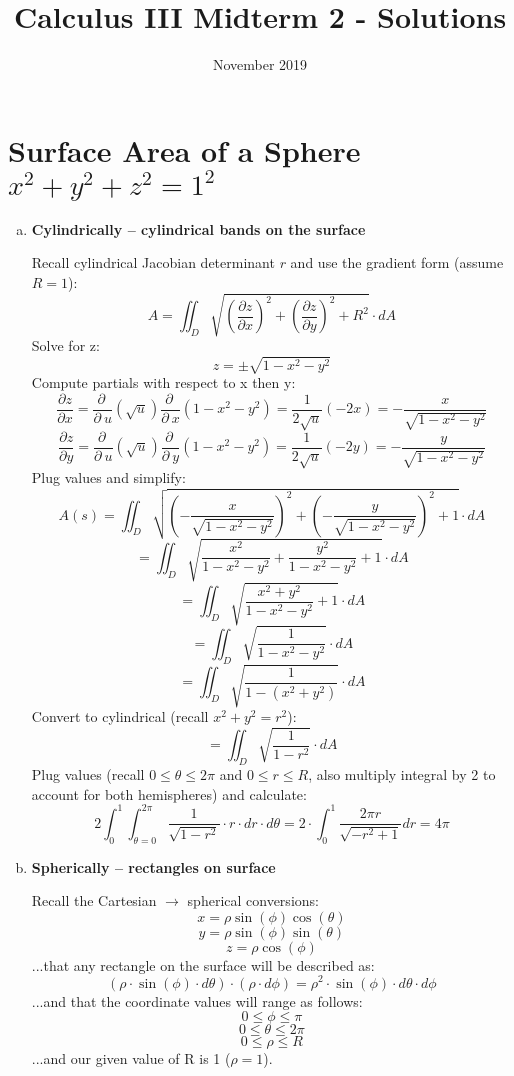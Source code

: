 \documentclass{article}
\title{Calculus III Midterm 2 - Solutions}
\date{November 2019}
\begin{document}
\maketitle

\section{Surface Area of a Sphere $x^2 + y^2 + z^2 = 1^2$ }
\begin{enumerate}[a.]
	\item \textbf{Cylindrically -- cylindrical bands on the surface }

            Recall cylindrical Jacobian determinant $ r $ and use the gradient form (assume $R = 1$):
            \[ A = \iint_{D}\sqrt{ (\frac{\partial z}{\partial x})^2 + (\frac{\partial z}{\partial y})^2 + R^2 } \cdot dA \]
            Solve for z:
            \[ z = \pm\sqrt{1-x^{2}-y^{2}} \]
            Compute partials with respect to x then y:
            \[ \frac{\partial z}{\partial x} = \frac{\partial \:}{\partial \:u}\left(\sqrt{u}\right)\frac{\partial \:}{\partial \:x}\left(1-x^2-y^2\right) = \frac{1}{2\sqrt{u}}\left(-2x\right) = -\frac{x}{\sqrt{1-x^2-y^2}} \]
            \[ \frac{\partial z}{\partial y} = \frac{\partial \:}{\partial \:u}\left(\sqrt{u}\right)\frac{\partial \:}{\partial \:y}\left(1-x^2-y^2\right) = \frac{1}{2\sqrt{u}}\left(-2y\right) = -\frac{y}{\sqrt{1-x^2-y^2}} \]
            Plug values and simplify:
            \[ A(s) = \iint_{D}\sqrt{\left(-\frac{x}{\sqrt{1-x^2-y^2}}\right)^2+\left(-\frac{y}{\sqrt{1-x^2-y^2}}\right)^2+1}  \cdot dA \]
            \[ = \iint_{D}\sqrt{\frac{x^2}{1-x^2-y^2}+\frac{y^2}{1-x^2-y^2}+1}  \cdot dA \]
            \[ = \iint_{D}\sqrt{\frac{x^2+y^2}{1-x^2-y^2}+1}  \cdot dA \]
            \[ = \iint_{D}\sqrt{\frac{1}{1-x^2-y^2}}  \cdot dA \]
            \[ = \iint_{D}\sqrt{\frac{1}{1-(x^2+y^2)}}  \cdot dA \]
            Convert to cylindrical (recall $x^2 + y^2 = r^2$):
            \[ = \iint_{D}\sqrt{\frac{1}{1-r^2}}  \cdot dA \]
            Plug values (recall $0 \leq \theta \leq 2\pi $ and $0 \leq r \leq R $, also multiply integral by 2 to account for both hemispheres) and calculate:
            \[ 2\int_{0}^{1}\int_{\theta=0}^{2\pi} \frac{1}{\sqrt{1-r^2}}\cdot r \cdot dr \cdot d\theta = 2\cdot \int _0^1\frac{2\pi r}{\sqrt{-r^2+1}}dr = 4\pi \]

	\item \textbf{Spherically -- rectangles on surface}

            Recall the Cartesian $\rightarrow$ spherical conversions:
            \[ x = \rho\sin(\phi)\cos(\theta)   \]
            \[ y = \rho\sin(\phi)\sin(\theta)  \]
            \[ z = \rho\cos(\phi)  \]
            ...that any rectangle on the surface will be described as:
            \[ (\rho\cdot\sin(\phi)\cdot d \theta)\cdot(\rho\cdot d \phi) = \rho^2\cdot\sin(\phi)\cdot d\theta\cdot d\phi \]
            ...and that the coordinate values will range as follows:
            \[ 0 \leq \phi \leq \pi  \]
            \[ 0 \leq \theta \leq 2\pi  \]
            \[ 0 \leq \rho \leq R \]
            ...and our given value of R is 1 ($\rho = 1$).


\end{enumerate}
\end{document}
